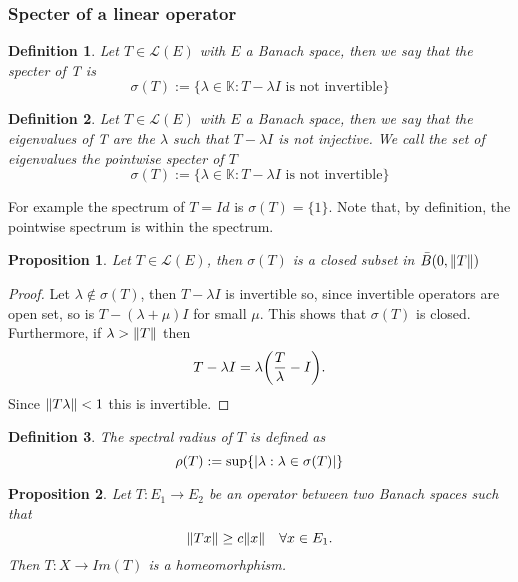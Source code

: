 \documentclass[12pt]{article}
\newtheorem{proposition}{Proposition}
\newtheorem{definition}{Definition}
\begin{document}
\subsubsection{Specter of a linear operator}
\begin{definition}
	Let $T\in\mathcal{L}(E)$ with $E$ a Banach space, then we say that the \emph{specter of T} is
	\begin{equation*}
		\sigma(T):=\{\lambda\in\mathbb{K}: T-\lambda I \text{ is not invertible}\}
	\end{equation*}
\end{definition}
\begin{definition}
	Let $T\in\mathcal{L}(E)$ with $E$ a Banach space, then we say that the \emph{eigenvalues of T} are the $\lambda$ such that $T-\lambda I$ is not injective. We call the set of eigenvalues the \emph{pointwise specter} of $T$
	\begin{equation*}
		\sigma(T):=\{\lambda\in\mathbb{K}: T-\lambda I \text{ is not invertible}\}
	\end{equation*}
\end{definition}
For example the spectrum of $T=Id$ is $\sigma(T)=\{1\}$. Note that, by definition, the pointwise spectrum is within the spectrum.
\begin{proposition}
	Let $T\in\mathcal{L}(E)$, then $\sigma(T)$ is a closed subset in $\bar{B}(0,\norm{T})$
\end{proposition}
\begin{proof}
	Let $\lambda\notin \sigma(T)$, then $T-\lambda I$ is invertible so, since invertible operators are open set, so is  $T-(\lambda+\mu) I$ for small $\mu$. This shows that $\sigma(T)$ is closed. Furthermore, if $\lambda>\norm{T}$ then
	\begin{equation*}
		T-\lambda I=\lambda \qty(\frac{T}{\lambda}-I).
	\end{equation*}
	Since $\norm{T\lambda}<1$ this is invertible.
\end{proof}
\begin{definition}
	The spectral radius of $T$ is defined as
	\begin{equation*}
		\rho(T):=\sup\{\abs{\lambda:\lambda\in\sigma(T)}\}
	\end{equation*}
\end{definition}
\begin{proposition}
	Let $T:E_1\to E_2$ be an operator between two Banach spaces such that
	\begin{equation*}
		\norm{Tx}\geq c\norm{x}\quad\forall x\in E_1.
	\end{equation*}
	Then $T:X\to Im(T)$ is a homeomorhphism.
\end{proposition}
\end{document}
